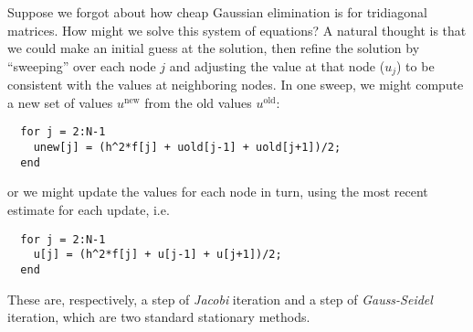 \documentclass[12pt, leqno]{article}
\begin{document}
Suppose we forgot about how cheap Gaussian elimination is for
tridiagonal matrices.  How might we solve this system of equations?
A natural thought is that we could make an initial guess at the
solution, then refine the solution by ``sweeping'' over each node $j$
and adjusting the value at that node ($u_j$) to be consistent with
the values at neighboring nodes.  In one sweep, we might compute
a new set of values $u^{\mathrm{new}}$ from the old values $u^{\mathrm{old}}$:
\begin{lstlisting}
  for j = 2:N-1
    unew[j] = (h^2*f[j] + uold[j-1] + uold[j+1])/2;
  end
\end{lstlisting}
or we might update the values for each node in turn, using the most
recent estimate for each update, i.e.
\begin{lstlisting}
  for j = 2:N-1
    u[j] = (h^2*f[j] + u[j-1] + u[j+1])/2;
  end
\end{lstlisting}
These are, respectively, a step of {\em Jacobi} iteration and a step
of {\em Gauss-Seidel} iteration, which are two standard stationary
methods.
\end{document}
